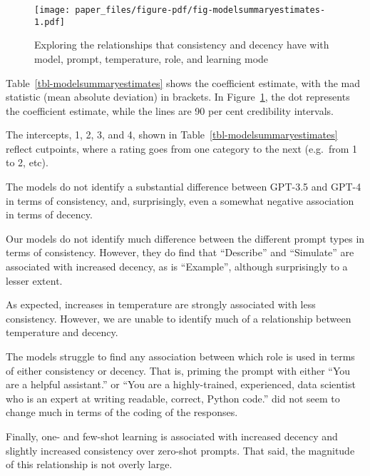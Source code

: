 \documentclass[
  letterpaper,
  DIV=11,
  numbers=noendperiod]{scrartcl}
\begin{document}
\begin{figure}

{\centering \texttt{[image: paper\_files/figure-pdf/fig-modelsummaryestimates-1.pdf]}

}

\caption{\label{fig-modelsummaryestimates}Exploring the relationships
that consistency and decency have with model, prompt, temperature, role,
and learning mode}

\end{figure}

Table~\ref{tbl-modelsummaryestimates} shows the coefficient estimate,
with the mad statistic (mean absolute deviation) in brackets. In
Figure~\ref{fig-modelsummaryestimates}, the dot represents the
coefficient estimate, while the lines are 90 per cent credibility
intervals.

The intercepts, 1, 2, 3, and 4,
shown in Table~\ref{tbl-modelsummaryestimates} reflect cutpoints, where
a rating goes from one category to the next (e.g.~from 1 to 2, etc).

The models do not identify a substantial difference between GPT-3.5 and
GPT-4 in terms of consistency, and, surprisingly, even a somewhat
negative association in terms of decency.

Our models do not identify much difference between the different prompt
types in terms of consistency. However, they do find that ``Describe''
and ``Simulate'' are associated with increased decency, as is
``Example'', although surprisingly to a lesser extent.

As expected, increases in temperature are strongly associated with less
consistency. However, we are unable to identify much of a relationship
between temperature and decency.

The models struggle to find any association between which role is used
in terms of either consistency or decency. That is, priming the prompt
with either ``You are a helpful assistant.'' or ``You are a
highly-trained, experienced, data scientist who is an expert at writing
readable, correct, Python code.'' did not seem to change much in terms
of the coding of the responses.

Finally, one- and few-shot learning is associated with increased decency
and slightly increased consistency over zero-shot prompts. That said,
the magnitude of this relationship is not overly large.
\end{document}
